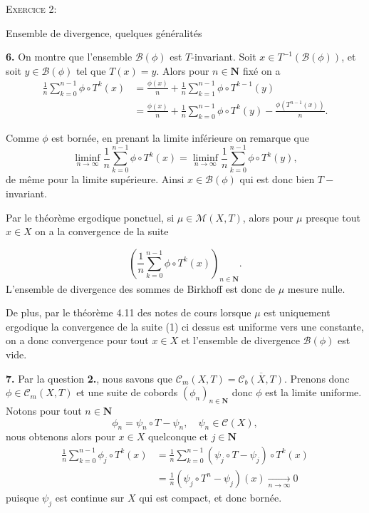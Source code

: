 \documentclass[12pt]{article}
\newenvironment{ex}[1]
{\begin{mdframed}[linewidth=0.6pt]
        \textsc{Exercice #1:}

}
    {\end{mdframed}}
\newcommand{\N}{\mathbf{N}}
\begin{document}
\begin{ex}{2}
       Ensemble de divergence, quelques généralités 
\end{ex}

\textbf{6.} On montre que l'ensemble $\mathcal{B}(\phi)$ est $T$-invariant. Soit $x \in T^{-1}(\mathcal{B}(\phi))$, et soit $y \in \mathcal{B}(\phi)$ tel que $T(x) = y$. Alors pour $n \in \N$ fixé on a 
\begin{align*}
        \frac{1}{n}\sum_{k=0}^{n-1} \phi\circ T^{k}(x) &= \frac{\phi(x)}{n} + \frac{1}{n}\sum_{k=1}^{n-1} \phi\circ T^{k-1}(y) \\
                                                       &=\frac{\phi(x)}{n} + \frac{1}{n}\sum_{k=0}^{n-1} \phi\circ T^{k}(y) - \frac{\phi(T^{n-1}(x))}{n}
.\end{align*}

Comme $\phi$ est bornée, en prenant la limite inférieure on remarque que \[
        \liminf_{n\to \infty} \frac{1}{n}\sum_{k=0}^{n-1} \phi\circ T^{k}(x) = \liminf_{n\to \infty} \frac{1}{n}\sum_{k=0}^{n-1} \phi\circ T^{k}(y)
,\] de même pour la limite supérieure. Ainsi $x \in \mathcal{B}(\phi)$ qui est donc bien $T-$invariant. 

\medskip

Par le théorème ergodique ponctuel, si $\mu \in \mathcal{M}(X,T)$, alors pour $\mu$ presque tout  $x \in X$ on a la convergence de la suite 

\begin{equation}
        (\frac{1}{n}\sum_{k=0}^{n-1} \phi\circ T^{k}(x))_{n\in\N}.
\end{equation}
L'ensemble de divergence des sommes de Birkhoff est donc de $\mu$ mesure nulle. 

\medskip

De plus, par le théorème 4.11 des notes de cours lorsque $\mu$ est uniquement ergodique la convergence de la suite (1) ci dessus est uniforme vers une constante, on a donc convergence pour tout  $x \in X$ et l'ensemble de divergence $\mathcal{B}(\phi)$ est vide.

\bigskip

\textbf{7.} Par la question \textbf{2.}, nous savons que $\mathcal{C}_{m}(X,T) = \overline{\mathcal{C}_{b}(X,T)}$. Prenons donc $\phi \in \mathcal{C}_{m}(X,T)$ et une suite de cobords $(\phi_{n})_{n\in\N}$ donc $\phi$ est la limite uniforme. Notons pour tout $n \in \N$ \[
        \phi_{n} = \psi_{n}\circ T - \psi_{n}, \quad \psi_{n} \in \mathcal{C}(X)
,\] nous obtenons alors pour $x \in X$ quelconque et $j\in\N$
\begin{align*}
        \frac{1}{n}\sum_{k=0}^{n-1} \phi_{j}\circ T^{k}(x) &= \frac{1}{n}\sum_{k=0}^{n-1} (\psi_{j}\circ T - \psi_{j})\circ T^{k}(x) \\
                                                            &= \frac{1}{n}(\psi_{j}\circ T^{n}-\psi_{j})(x) \underset{n \to \infty}{\longrightarrow} 0
\end{align*} puisque $\psi_{j}$ est continue sur $X$ qui est compact, et donc bornée.
\end{document}
